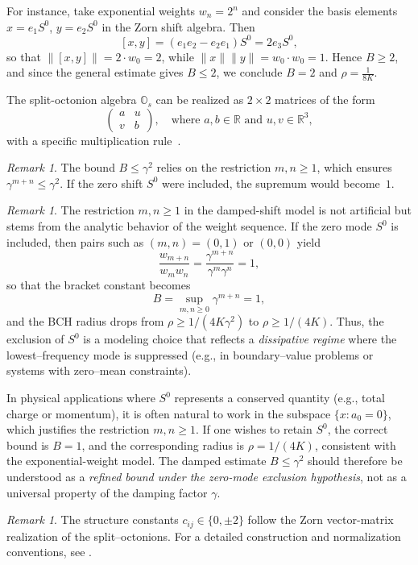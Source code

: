 \documentclass[11pt]{amsart}
\numberwithin{equation}{section}
\theoremstyle{remark}
\newtheorem{remark}[theorem]{Remark}
\begin{document}
For instance, take exponential weights $w_n = 2^n$ and consider the basis elements $x = e_1 S^0$, $y = e_2 S^0$ in the Zorn shift algebra. Then
\[
[x, y] = (e_1 e_2 - e_2 e_1) S^0 = 2 e_3 S^0,
\]
so that $\|[x,y]\| = 2 \cdot w_0 = 2$, while $\|x\|\|y\| = w_0 \cdot w_0 = 1$. Hence $B \geq 2$, and since the general estimate gives $B \leq 2$, we conclude $B = 2$ and $\rho = \frac{1}{8K}$.

The split-octonion algebra $\mathbb{O}_s$ can be realized as $2 \times 2$ matrices of the form
\[
\begin{pmatrix}
a & u \\
v & b
\end{pmatrix}, \quad \text{where } a, b \in \mathbb{R} \text{ and } u, v \in \mathbb{R}^3,
\]
with a specific multiplication rule~\cite{Baez2002}.

\medskip
\begin{remark}
The bound $B\le\gamma^2$ relies on the restriction $m,n\ge1$,
which ensures $\gamma^{m+n}\le\gamma^2$.
If the zero shift $S^0$ were included, the supremum would become~$1$.
\end{remark}
\begin{remark}
The restriction $m,n \geq 1$ in the damped-shift model is not artificial but stems from the analytic behavior of the weight sequence. If the zero mode $S^0$ is included, then pairs such as $(m,n) = (0,1)$ or $(0,0)$ yield
\[
\frac{w_{m+n}}{w_m w_n} = \frac{\gamma^{m+n}}{\gamma^m \gamma^n} = 1,
\]
so that the bracket constant becomes
\[
B = \sup_{m,n \geq 0} \gamma^{m+n} = 1,
\]
and the BCH radius drops from $\rho \geq 1/(4K\gamma^2)$ to $\rho \geq 1/(4K)$. Thus, the exclusion of $S^0$ is a modeling choice that reflects a \emph{dissipative regime} where the lowest--frequency mode is suppressed (e.g., in boundary--value problems or systems with zero--mean constraints).

In physical applications where $S^0$ represents a conserved quantity (e.g., total charge or momentum), it is often natural to work in the subspace $\{x : a_0 = 0\}$, which justifies the restriction $m,n \geq 1$. If one wishes to retain $S^0$, the correct bound is $B = 1$, and the corresponding radius is $\rho = 1/(4K)$, consistent with the exponential-weight model. The damped estimate $B \leq \gamma^2$ should therefore be understood as a \emph{refined bound under the zero-mode exclusion hypothesis}, not as a universal property of the damping factor $\gamma$.
\end{remark}

\medskip
\begin{remark}
The structure constants $c_{ij}\in\{0,\pm2\}$ follow the Zorn
vector-matrix realization of the split--octonions.
For a detailed construction and normalization conventions,
see \cite{Baez2002}.
\end{remark}
\end{document}
